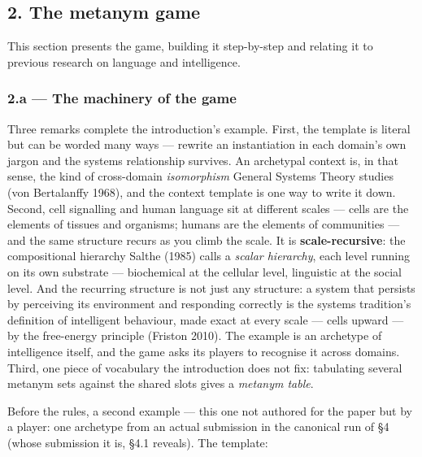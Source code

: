 \subsection{2. The metanym game}\label{the-metanym-game}

This section presents the game, building it step-by-step and relating it to previous research on language and intelligence.

\subsubsection{2.a --- The machinery of the game}\label{a-the-machinery-of-the-game}

Three remarks complete the introduction's example. First, the template is literal but can be worded many ways --- rewrite an instantiation in each domain's own jargon and the systems relationship survives. An archetypal context is, in that sense, the kind of cross-domain \emph{isomorphism} General Systems Theory studies (von Bertalanffy 1968), and the context template is one way to write it down. Second, cell signalling and human language sit at different scales --- cells are the elements of tissues and organisms; humans are the elements of communities --- and the same structure recurs as you climb the scale. It is \textbf{scale-recursive}: the compositional hierarchy Salthe (1985) calls a \emph{scalar hierarchy}, each level running on its own substrate --- biochemical at the cellular level, linguistic at the social level. And the recurring structure is not just any structure: a system that persists by perceiving its environment and responding correctly is the systems tradition's definition of intelligent behaviour, made exact at every scale --- cells upward --- by the free-energy principle (Friston 2010). The example is an archetype of intelligence itself, and the game asks its players to recognise it across domains. Third, one piece of vocabulary the introduction does not fix: tabulating several metanym sets against the shared slots gives a \emph{metanym table}.

Before the rules, a second example --- this one not authored for the paper but by a player: one archetype from an actual submission in the canonical run of §4 (whose submission it is, §4.1 reveals). The template:

